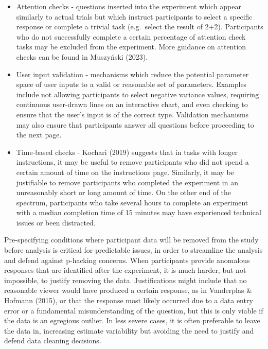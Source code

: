 \documentclass[
  10pt,
]{article}
\begin{document}
\begin{itemize}
\item
  Attention checks - questions inserted into the experiment which appear
  similarly to actual trials but which instruct participants to select a
  specific response or complete a trivial task (e.g.~select the result
  of 2+2). Participants who do not successfully complete a certain
  percentage of attention check tasks may be excluded from the
  experiment. More guidance on attention checks can be found in
  Muszyński (2023).
\item
  User input validation - mechanisms which reduce the potential
  parameter space of user inputs to a valid or reasonable set of
  parameters. Examples include not allowing participants to select
  negative variance values, requiring continuous user-drawn lines on an
  interactive chart, and even checking to ensure that the user's input
  is of the correct type. Validation mechanisms may also ensure that
  participants answer all questions before proceeding to the next page.
\item
  Time-based checks - Kochari (2019) suggests that in tasks with longer
  instructions, it may be useful to remove participants who did not
  spend a certain amount of time on the instructions page. Similarly, it
  may be justifiable to remove participants who completed the experiment
  in an unreasonably short or long amount of time. On the other end of
  the spectrum, participants who take several hours to complete an
  experiment with a median completion time of 15 minutes may have
  experienced technical issues or been distracted.
\end{itemize}

Pre-specifying conditions where participant data will be removed from
the study before analysis is critical for predictable issues, in order
to streamline the analysis and defend against p-hacking concerns. When
participants provide anomalous responses that are identified after the
experiment, it is much harder, but not impossible, to justify removing
the data. Justifications might include that no reasonable viewer would
have produced a certain response, as in Vanderplas \& Hofmann (2015), or
that the response most likely occurred due to a data entry error or a
fundamental misunderstanding of the question, but this is only viable if
the data is an egregious outlier. In less severe cases, it is often
preferable to leave the data in, increasing estimate variability but
avoiding the need to justify and defend data cleaning decisions.
\end{document}
